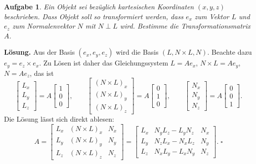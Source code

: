 \documentclass[a4paper,10pt,fleqn,twoside]{scrartcl}
\numberwithin{equation}{section}
\newcommand{\strong}[1]{{\normalfont\sffamily\bfseries #1}}
\renewcommand{\qedsymbol}{\ensuremath{\square}}
\theoremstyle{Aufgabe}
\newtheorem{Aufgabe}{\sffamily Aufgabe}[section]
\begin{document}
\begin{Aufgabe}\label{Trafo-L-N}
Ein Objekt sei bezüglich kartesischen Koordinaten
$(x,y,z)$ beschrieben. Dass Objekt soll so transformiert werden,
dass $e_x$ zum Vektor $L$ und $e_z$ zum Normalenvektor $N$ mit
$N\perp L$ wird. Bestimme die Transformationsmatrix $A$.
\end{Aufgabe}
\strong{Lösung.} Aus der Basis $(e_x,e_y,e_z)$ wird die Basis
$(L,N\times L,N)$. Beachte dazu $e_y = e_z\times e_x$. Zu Lösen ist
daher das Gleichungssystem $L=Ae_x$, $N\times L=Ae_y$, $N=Ae_z$,
das ist
\begin{equation}
\begin{bmatrix}
L_x\\ L_y\\ L_z
\end{bmatrix}
= A\begin{bmatrix}
1\\ 0\\ 0
\end{bmatrix},\qquad
\begin{bmatrix}
(N\times L)_x\\ (N\times L)_y\\ (N\times L)_z
\end{bmatrix}
= A\begin{bmatrix}
0\\ 1\\ 0
\end{bmatrix},\qquad
\begin{bmatrix}
N_x\\ N_y\\ N_z
\end{bmatrix}
= A\begin{bmatrix}
0\\ 0\\ 1
\end{bmatrix}.
\end{equation}
Die Lösung lässt sich direkt ablesen:
\begin{equation}
A = \begin{bmatrix}
L_x & (N\times L)_x & N_x\\
L_y & (N\times L)_y & N_y\\
L_z & (N\times L)_z & N_z
\end{bmatrix} = \begin{bmatrix}
L_x & N_y L_z-L_y N_z & N_x\\
L_y & N_z L_x-N_x L_z & N_y\\
L_z & N_x L_y-L_x N_y & N_z
\end{bmatrix}.\;\qedsymbol
\end{equation}
\end{document}
